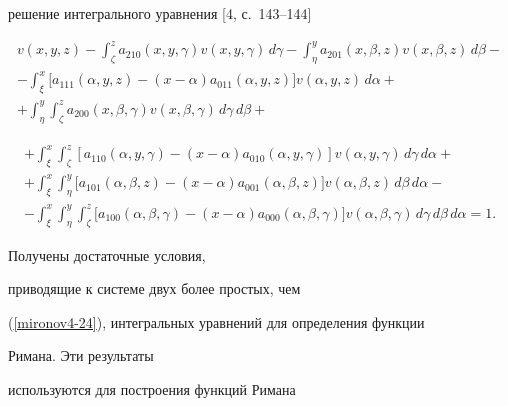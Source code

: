 решение интегрального уравнения [4, с.~143--144]


\begin{multline*}


 v(x, y, z)-\int_{\zeta}^{z} a_{210}(x,y,\gamma)v(x,y,\gamma) \,d\gamma


-\int_{\eta}^{y} a_{201}(x,\beta,z)v(x,\beta,z) \,d\beta-


\\


-\int_{\xi}^{x} \bigl[a_{111}(\alpha,y,z)-(x-\alpha)a_{011}(\alpha,y,z)\bigr]


v(\alpha,y,z) \,d\alpha+


\\


+\int_{\eta}^{y} \int_{\zeta}^{z}


a_{200}(x,\beta,\gamma) v(x,\beta,\gamma)\, d\gamma \,d\beta+


\end{multline*}


\begin{multline}


+\int_{\xi}^{x} \int_{\zeta}^{z} [a_{110}(\alpha,y,\gamma)


-(x-\alpha)a_{010}(\alpha,y,\gamma)]v(\alpha,y,\gamma) \,d\gamma \,d\alpha+


\\


+\int_{\xi}^{x} \int_{\eta}^{y} \bigl[a_{101}(\alpha,\beta,z)


-(x-\alpha)a_{001}(\alpha,\beta,z)\bigr]v(\alpha,\beta,z) \,d\beta \,d\alpha-


\\


\label{mironov4-24}


-\int_{\xi}^{x} \int_{\eta}^{y} \int_{\zeta}^{z}


\bigl[a_{100}(\alpha,\beta,\gamma)


-(x-\alpha)a_{000}(\alpha,\beta,\gamma)\bigr]v(\alpha,\beta,\gamma)


\,d\gamma \,d\beta \,d\alpha=1.


\end{multline}


Получены достаточные условия,


приводящие к системе двух более простых, чем


(\ref{mironov4-24}), интегральных уравнений для определения функции


Римана. Эти результаты


используются для построения функций Римана


